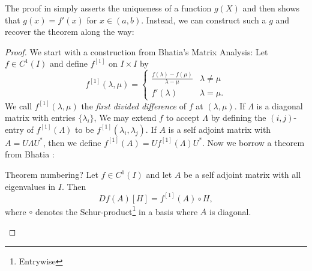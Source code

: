 The proof in \cite{pascoeTrace2020} simply asserts the uniqueness of a function
\(g(X)\) and then shows that \(g(x)=f'(x)\) for \(x \in (a,b)\). Instead, we can
construct such a \(g\) and recover the theorem along the way:
\begin{proof}

We start with a construction from Bhatia's Matrix Analysis: Let
$f \in C ^{1} (I)$ and define $f ^{[1]} $ on $I \times I$ by
\[
  f^{[1]} (\lambda,\mu) =
  \begin{cases}
    \frac{f(\lambda) - f(\mu)}{\lambda-\mu} & \lambda \neq \mu \\
    f'(\lambda) & \lambda = \mu.
  \end{cases}
\]
We call $f ^{[1]} (\lambda,\mu)$ the \emph{first divided difference} of $f$ at
$(\lambda,\mu)$. If $\Lambda$ is a diagonal matrix with entries
$\{ \lambda_{i}\} $, We may extend $f$ to accept $\Lambda$ by
defining the $(i,j)$-entry of $f ^{[1]} (\Lambda)$ to be
$f ^{[1]} (\lambda_i,\lambda_j)$. If $A$ is a self adjoint matrix with
$A = U \Lambda U ^{*} $, then we define
$f ^{[1]} (A) = U f ^{[1]} (\Lambda) U ^{*} $. Now we borrow a theorem from
Bhatia \cite{bhatiaMatrixAnalysis1997}:
\begin{theorem}[Bhatia V.3.3]

{\color{red} Theorem numbering?}
  Let $f \in C ^{1} (I)$ and let $A$ be a self adjoint matrix with all
  eigenvalues in $I$. Then \[
    Df(A)[H] = f ^{[1]} (A) \circ H,
  \]
  where $\circ$ denotes the Schur-product\footnote{Entrywise} in a basis where $A$ is diagonal.
\end{theorem}


\end{proof}
